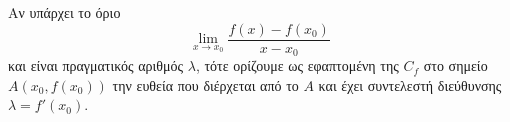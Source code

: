 Αν υπάρχει το όριο
\[ \lim_{x\to x_0}{\frac{f(x)-f(x_0)}{x-x_0}} \]
και είναι πραγματικός αριθμός $ \lambda $, τότε ορίζουμε ως εφαπτομένη της $ C_f $ στο σημείο $ A(x_0,f(x_0)) $ την ευθεία που διέρχεται από το $ A $ και έχει συντελεστή διεύθυνσης $ \lambda=f'(x_0) $.
